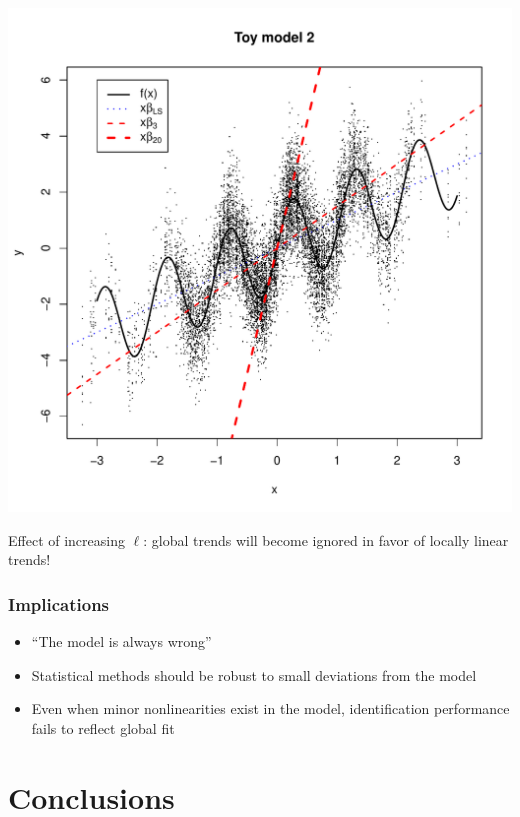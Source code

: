 \documentclass{beamer}
\begin{document}
\begin{frame}
\begin{center}
\includegraphics[scale = 0.4]{toy2_plot2.pdf}
\end{center}
Effect of increasing $\ell$: global trends will become ignored in
favor of locally linear trends!
\end{frame}

\begin{frame}
\frametitle{Implications}
\begin{itemize}
\item
``The model is always wrong''
\item
Statistical methods should be robust to small deviations from the
model
\item
Even when minor nonlinearities exist in the model, identification
performance fails to reflect global fit
\end{itemize}
\end{frame}

\section{Conclusions}
\end{document}
